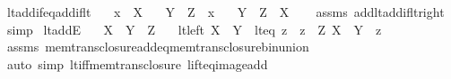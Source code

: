 \begin{isabellebody}
\endisatagproof
{\isafoldproof}%
%
\isadelimproof
\isanewline
%
\endisadelimproof
\isanewline
{}\isamarkupfalse%
\ lt{\isacharunderscore}{\kern0pt}add{\isacharunderscore}{\kern0pt}if{\isacharunderscore}{\kern0pt}eq{\isacharunderscore}{\kern0pt}add{\isacharunderscore}{\kern0pt}if{\isacharunderscore}{\kern0pt}lt{\isacharcolon}{\kern0pt}\isanewline
\ \ \ {\isachardoublequoteopen}x\ {\isacharless}{\kern0pt}\ X{\isachardoublequoteclose}\isanewline
\ \ \ {\isachardoublequoteopen}Y\ {\isacharequal}{\kern0pt}\ Z\ {\isacharplus}{\kern0pt}\ x{\isachardoublequoteclose}\isanewline
\ \ \ {\isachardoublequoteopen}Y\ {\isacharless}{\kern0pt}\ Z\ {\isacharplus}{\kern0pt}\ X{\isachardoublequoteclose}\isanewline
%
\isadelimproof
\ \ %
\endisadelimproof
%
\isatagproof
{}\isamarkupfalse%
\ assms\ add{\isacharunderscore}{\kern0pt}lt{\isacharunderscore}{\kern0pt}add{\isacharunderscore}{\kern0pt}if{\isacharunderscore}{\kern0pt}lt{\isacharunderscore}{\kern0pt}right\ \isamarkupfalse%
\ simp%
\endisatagproof
{\isafoldproof}%
%
\isadelimproof
\isanewline
%
\endisadelimproof
\isanewline
{}\isamarkupfalse%
\ lt{\isacharunderscore}{\kern0pt}addE{\isacharcolon}{\kern0pt}\isanewline
\ \ \ {\isachardoublequoteopen}X\ {\isacharless}{\kern0pt}\ Y\ {\isacharplus}{\kern0pt}\ Z{\isachardoublequoteclose}\isanewline
\ \ \ {\isacharparenleft}{\kern0pt}lt{\isacharunderscore}{\kern0pt}left{\isacharparenright}{\kern0pt}\ {\isachardoublequoteopen}X\ {\isacharless}{\kern0pt}\ Y{\isachardoublequoteclose}\ {\isacharbar}{\kern0pt}\ {\isacharparenleft}{\kern0pt}lt{\isacharunderscore}{\kern0pt}eq{\isacharparenright}{\kern0pt}\ z\ \ {\isachardoublequoteopen}z\ {\isacharless}{\kern0pt}\ Z{\isachardoublequoteclose}\ {\isachardoublequoteopen}X\ {\isacharequal}{\kern0pt}\ Y\ {\isacharplus}{\kern0pt}\ z{\isachardoublequoteclose}\isanewline
%
\isadelimproof
\ \ %
\endisadelimproof
%
\isatagproof
{}\isamarkupfalse%
\ assms\ mem{\isacharunderscore}{\kern0pt}trans{\isacharunderscore}{\kern0pt}closure{\isacharunderscore}{\kern0pt}add{\isacharunderscore}{\kern0pt}eq{\isacharunderscore}{\kern0pt}mem{\isacharunderscore}{\kern0pt}trans{\isacharunderscore}{\kern0pt}closure{\isacharunderscore}{\kern0pt}bin{\isacharunderscore}{\kern0pt}union\isanewline
\ \ \isamarkupfalse%
\ {\isacharparenleft}{\kern0pt}auto\ simp{\isacharcolon}{\kern0pt}\ lt{\isacharunderscore}{\kern0pt}iff{\isacharunderscore}{\kern0pt}mem{\isacharunderscore}{\kern0pt}trans{\isacharunderscore}{\kern0pt}closure\ lift{\isacharunderscore}{\kern0pt}eq{\isacharunderscore}{\kern0pt}image{\isacharunderscore}{\kern0pt}add{\isacharparenright}{\kern0pt}%

\end{isabellebody}
